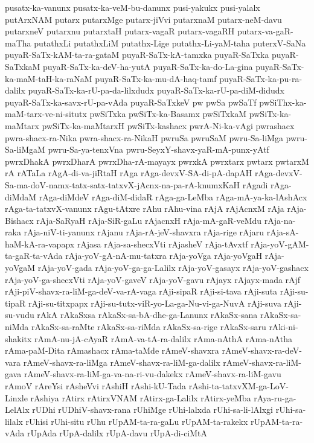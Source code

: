 {pusatx-ka-vanunx
pusatx-ka-veM-bu-danunx
pusi-yakukx
pusi-yalalx
putArxNAM
putarx
putarxMge
putarx-jiVvi
putarxnaM
putarx-neM-davu
putarxneV
putarxnu
putarxtaH
putarx-vagaR
putarx-vagaRH
putarx-va-gaR-maTha
putathxLi
putathxLiM
putathx-Lige
putathx-Li-yaM-taha
puterxV-SaNa
puyaR-SaTx-kAM-ta-ra-gataM
puyaR-SaTx-kA-tamxka
puyaR-SaTxka
puyaR-SaTxkaM
puyaR-SaTx-ka-deV-ha-yutA
puyaR-SaTx-ka-do-La-gina
puyaR-SaTx-ka-maM-taH-ka-raNaM
puyaR-SaTx-ka-mu-dA-haq-tamf
puyaR-SaTx-ka-pu-ra-dalilx
puyaR-SaTx-ka-rU-pa-da-lilxdudx
puyaR-SaTx-ka-rU-pa-diM-didudx
puyaR-SaTx-ka-savx-rU-pa-vAda
puyaR-SaTxkeV
pw
pwSa
pwSaTf
pwSiThx-ka-maM-tarx-ve-ni-situtx
pwSiTxka
pwSiTx-ka-Basamx
pwSiTxkaM
pwSiTx-ka-maMtarx
pwSiTx-ka-maMtarxH
pwSiTx-kashacx
pwrA-Ni-ka-vAgi
pwrashacx
pwra-shacx-ra-Nika
pwra-shacx-ra-NikaH
pwruSa
pwruSaM
pwru-Sa-liMga
pwru-Sa-liMgaM
pwru-Sa-ya-tenxVna
pwru-SeyxY-shavx-yaR-mA-punx-yAtf
pwrxDhakA
pwrxDharA
pwrxDha-rA-mayayx
pwrxkA
pwrxtarx
pwtarx
pwtarxM
rA
rATaLa
rAgA-di-va-jiRtaH
rAga
rAga-devxV-SA-di-pA-dapAH
rAga-devxV-Sa-ma-doV-namx-tatx-satx-tatxvX-jAcnx-na-pa-rA-knumxKaH
rAgadi
rAga-diMdaM
rAga-diMdeV
rAga-diM-didaR
rAga-ga-LeMba
rAga-mA-ya-ka-lAshAcx
rAga-ta-tatxvX-vanunx
rAgu-tAtxre
rAhu
rAhu-vina
rAjA
rAjAcnxM
rAja
rAja-Bishacx
rAja-SaRyaH
rAja-SiR-gaLu
rAjacnxH
rAja-mA-gaR-veMdu
rAja-na-raka
rAja-niV-ti-yanunx
rAjanu
rAja-rA-jeV-shavxra
rAja-rige
rAjaru
rAja-sA-haM-kA-ra-vapapx
rAjasa
rAja-sa-shecxVti
rAjasheV
rAja-tAvxtf
rAja-yoV-gAM-ta-gaR-ta-vAda
rAja-yoV-gA-nA-mu-tatxra
rAja-yoVga
rAja-yoVgaH
rAja-yoVgaM
rAja-yoV-gada
rAja-yoV-ga-ga-Lalilx
rAja-yoV-gasayx
rAja-yoV-gashacx
rAja-yoV-ga-shecxVti
rAja-yoV-gaveV
rAja-yoV-gavu
rAjayx
rAjayx-mada
rAjf
rAji-piV-shavx-ra-liM-ga-deV-va-rA-vaga
rAji-sipaR
rAji-si-tava
rAji-suta
rAji-su-tipaR
rAji-su-titxpapx
rAji-su-tutx-viR-yo-La-ga-Nu-vi-ga-NuvA
rAji-suva
rAji-su-vudu
rAkA
rAkaSxsa
rAkaSx-sa-bA-dhe-ga-Lanunx
rAkaSx-sana
rAkaSx-sa-niMda
rAkaSx-sa-raMte
rAkaSx-sa-riMda
rAkaSx-sa-rige
rAkaSx-saru
rAki-ni-shakitx
rAmA-nu-jA-cAyaR
rAmA-va-tA-ra-dalilx
rAma-nAthA
rAma-nAtha
rAma-paM-Dita
rAmashacx
rAma-taMde
rAmeV-shavxra
rAmeV-shavx-ra-deV-vara
rAmeV-shavx-ra-liMga
rAmeV-shavx-ra-liM-ga-dalilx
rAmeV-shavx-ra-liM-gava
rAmeV-shavx-ra-liM-ga-va-na-ri-vu-dakekx
rAmeV-shavx-ra-liM-gavu
rAmoV
rAreYsi
rAsheVvi
rAshiH
rAshi-kU-Tada
rAshi-ta-tatxvXM-ga-LoV-Linxle
rAshiya
rAtirx
rAtirxVNAM
rAtirx-ga-Lalilx
rAtirx-yeMba
rAya-ru-ga-LelAlx
rUDhi
rUDhiV-shavx-rana
rUhiMge
rUhi-lalxda
rUhi-sa-li-lAlxgi
rUhi-sa-lilalx
rUhisi
rUhi-situ
rUhu
rUpAM-ta-ra-gaLu
rUpAM-ta-rakekx
rUpAM-ta-ra-vAda
rUpAda
rUpA-dalilx
rUpA-davu
rUpA-di-ciMtA
}
